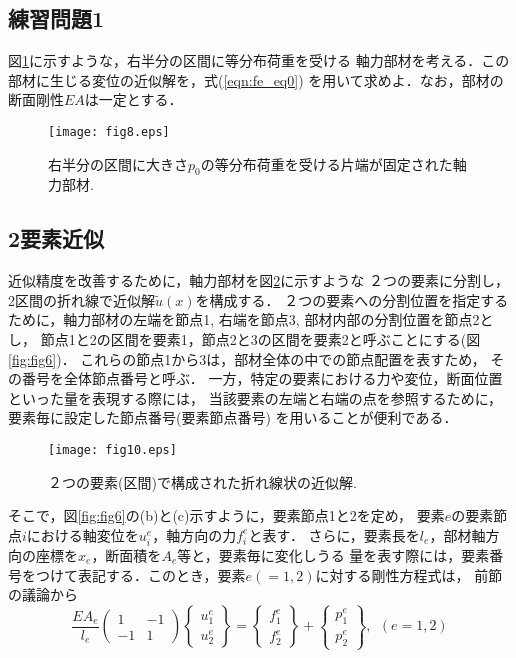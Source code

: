 \documentclass[10pt,a4j]{jarticle}
\begin{document}
\subsection{練習問題1}
図\ref{fig:fig8}に示すような，右半分の区間に等分布荷重を受ける
軸力部材を考える．この部材に生じる変位の近似解を，式(\ref{eqn:fe_eq0})
を用いて求めよ．なお，部材の断面剛性$EA$は一定とする．
\begin{figure}[h]
	\begin{center}
	\texttt{[image: fig8.eps]} 
	\end{center}
	\caption{右半分の区間に大きさ$p_0$の等分布荷重を受ける片端が固定された軸力部材.} 
	\label{fig:fig8}
\end{figure}
\subsection{2要素近似}
近似精度を改善するために，軸力部材を図\ref{fig:fig10}に示すような
２つの要素に分割し，2区間の折れ線で近似解$\tilde u(x)$を構成する．
２つの要素への分割位置を指定するために，軸力部材の左端を節点1, 
右端を節点3, 部材内部の分割位置を節点2とし，
節点1と2の区間を要素1，節点2と3の区間を要素2と呼ぶことにする(図\ref{fig:fig6})．
これらの節点1から3は，部材全体の中での節点配置を表すため，
その番号を全体節点番号と呼ぶ．
一方，特定の要素における力や変位，断面位置といった量を表現する際には，
当該要素の左端と右端の点を参照するために，要素毎に設定した節点番号(要素節点番号)
を用いることが便利である．
\begin{figure}[h]
	\begin{center}
	\texttt{[image: fig10.eps]} 
	\end{center}
	\caption{２つの要素(区間)で構成された折れ線状の近似解.} 
	\label{fig:fig10}
\end{figure}
そこで，図\ref{fig:fig6}の(b)と(c)示すように，要素節点1と2を定め，
要素$e$の要素節点$i$における軸変位を$u^e_i$，軸方向の力$f^e_i$と表す．
さらに，要素長を$l_e$，部材軸方向の座標を$x_e$，断面積を$A_e$等と，要素毎に変化しうる
量を表す際には，要素番号をつけて表記する．このとき，要素$e(=1,2)$に対する剛性方程式は，
前節の議論から
\begin{equation}
	\frac{EA_e}{l_e}
	\left(
	\begin{array}{cc}
		1 & -1  \\
		-1 & 1 
	\end{array}
	\right)
	\left\{
	\begin{array}{c}
		u^e_1 \\
		u^e_2
	\end{array}
	\right\}
	=
	\left\{
	\begin{array}{c}
		f^e_1  \\
		f^e_2 
	\end{array}
	\right\}
	+
	\left\{
	\begin{array}{c}
		p^e_1 \\
		p^e_2 
	\end{array}
	\right\}, 
	\ \ 
	(e=1,2)
	\label{eqn:fe_eq_e}
\end{equation}
\end{document}
